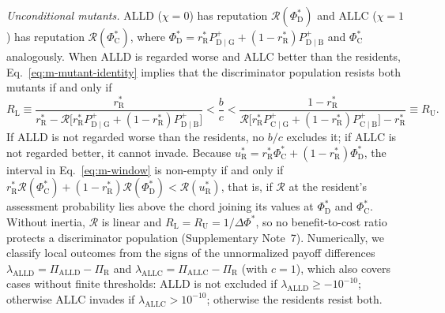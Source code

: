 \textit{Unconditional mutants.} ALLD ($\chi=0$) has reputation
$\mathcal R(\Phi^*_{\mathrm D})$ and ALLC ($\chi=1$) has reputation
$\mathcal R(\Phi^*_{\mathrm C})$, where
$\Phi^*_{\mathrm D}=r^*_{\mathrm R}P^+_{\mathrm D\mid\mathrm G}+(1-r^*_{\mathrm R})P^+_{\mathrm D\mid\mathrm B}$
and $\Phi^*_{\mathrm C}$ analogously. When ALLD is regarded worse and ALLC
better than the residents, Eq.~\eqref{eq:m-mutant-identity} implies that the
discriminator population resists both mutants if and only if
\begin{equation}
R_{\mathrm L}\equiv
\frac{r^*_{\mathrm R}}
{r^*_{\mathrm R}-\mathcal R\bigl[r^*_{\mathrm R}P^+_{\mathrm D\mid\mathrm G}
+(1-r^*_{\mathrm R})P^+_{\mathrm D\mid\mathrm B}\bigr]}
<\frac bc<
\frac{1-r^*_{\mathrm R}}
{\mathcal R\bigl[r^*_{\mathrm R}P^+_{\mathrm C\mid\mathrm G}
+(1-r^*_{\mathrm R})P^+_{\mathrm C\mid\mathrm B}\bigr]-r^*_{\mathrm R}}
\equiv R_{\mathrm U}.
\label{eq:m-window}
\end{equation}
If ALLD is not regarded worse than the residents, no $b/c$ excludes it; if ALLC
is not regarded better, it cannot invade. Because
$u^*_{\mathrm R}=r^*_{\mathrm R}\Phi^*_{\mathrm C}+(1-r^*_{\mathrm R})\Phi^*_{\mathrm D}$,
the interval in Eq.~\eqref{eq:m-window} is non-empty if and only if
$r^*_{\mathrm R}\mathcal R(\Phi^*_{\mathrm C})+(1-r^*_{\mathrm R})\mathcal R(\Phi^*_{\mathrm D})
<\mathcal R(u^*_{\mathrm R})$, that is, if $\mathcal R$ at the resident's
assessment probability lies above the chord joining its values at
$\Phi^*_{\mathrm D}$ and $\Phi^*_{\mathrm C}$. Without inertia,
$\mathcal R$ is linear and $R_{\mathrm L}=R_{\mathrm U}=1/\Delta\Phi^*$, so no
benefit-to-cost ratio protects a discriminator population (Supplementary
Note~7). Numerically, we classify local outcomes from the signs of the
unnormalized payoff differences
$\lambda_{\mathrm{ALLD}}=\Pi_{\mathrm{ALLD}}-\Pi_{\mathrm R}$ and
$\lambda_{\mathrm{ALLC}}=\Pi_{\mathrm{ALLC}}-\Pi_{\mathrm R}$ (with $c=1$), which also
covers cases without finite thresholds: ALLD is not excluded if
$\lambda_{\mathrm{ALLD}}\ge-10^{-10}$; otherwise ALLC invades if
$\lambda_{\mathrm{ALLC}}>10^{-10}$; otherwise the residents resist both.


